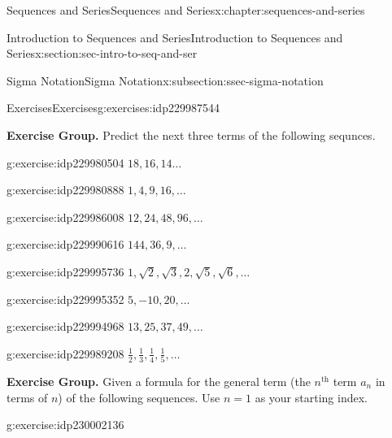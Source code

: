 \documentclass[twoside,10pt,]{book}
\numberwithin{equation}{section}
\newcommand{\nth}{{n^{\text{th}}}}
\begin{document}
\begin{chapterptx}{Sequences and Series}{}{Sequences and Series}{}{}{x:chapter:sequences-and-series}
\begin{sectionptx}{Introduction to Sequences and Series}{}{Introduction to Sequences and Series}{}{}{x:section:sec-intro-to-seq-and-ser}
\begin{subsectionptx}{Sigma Notation}{}{Sigma Notation}{}{}{x:subsection:ssec-sigma-notation}
\end{subsectionptx}
%
%
\typeout{************************************************}
\typeout{************************************************}
%
\begin{exercises-subsection}{Exercises}{}{Exercises}{}{}{g:exercises:idp229987544}
\par\medskip\noindent%
\textbf{Exercise Group.}\space\space%
Predict the next three terms of the following sequnces.\begin{exercisegroup}
\begin{divisionexerciseeg}{1}{}{}{g:exercise:idp229980504}%
\(18, 16, 14\ldots\)\end{divisionexerciseeg}%
\begin{divisionexerciseeg}{2}{}{}{g:exercise:idp229980888}%
\(1, 4, 9, 16, \ldots\)\end{divisionexerciseeg}%
\begin{divisionexerciseeg}{3}{}{}{g:exercise:idp229986008}%
\(12, 24, 48, 96, \ldots\)\end{divisionexerciseeg}%
\begin{divisionexerciseeg}{4}{}{}{g:exercise:idp229990616}%
\(144, 36, 9, \ldots\)\end{divisionexerciseeg}%
\begin{divisionexerciseeg}{5}{}{}{g:exercise:idp229995736}%
\(1,\sqrt 2 ,\sqrt 3 ,2,\sqrt 5 ,\sqrt 6 ,\ldots\)\end{divisionexerciseeg}%
\begin{divisionexerciseeg}{6}{}{}{g:exercise:idp229995352}%
\(5, -10, 20, \ldots\)\end{divisionexerciseeg}%
\begin{divisionexerciseeg}{7}{}{}{g:exercise:idp229994968}%
\(13, 25, 37, 49, \ldots\)\end{divisionexerciseeg}%
\begin{divisionexerciseeg}{8}{}{}{g:exercise:idp229989208}%
\(\frac{1}{2},\frac{1}{3},\frac{1}{4},\frac{1}{5},\ldots\)\end{divisionexerciseeg}%
\end{exercisegroup}
\par\medskip\noindent
\par\medskip\noindent%
\textbf{Exercise Group.}\space\space%
Given a formula for the general term (the \(\nth{}\) term \(a_n\) in terms of \(n\)) of the following sequences.  Use \(n = 1\) as your starting index.\begin{exercisegroup}
\begin{divisionexerciseeg}{9}{}{}{g:exercise:idp230002136}%

\end{divisionexerciseeg}
\end{exercisegroup}
\end{exercises-subsection}
\end{sectionptx}
\end{chapterptx}
\end{document}
